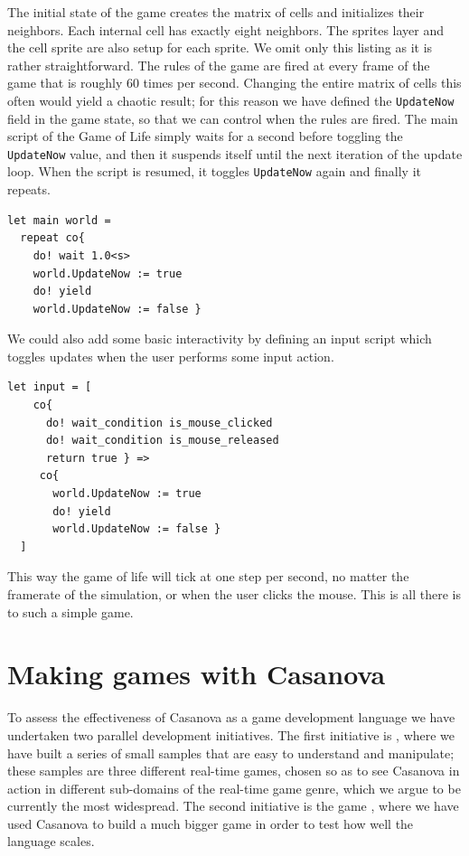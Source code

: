 The initial state of the game creates the matrix of cells and initializes their neighbors. Each internal cell has exactly eight neighbors. The sprites layer and the cell sprite are also setup for each sprite. We omit only this listing as it is rather straightforward. The rules of the game are fired at every frame of the game that is roughly 60 times per second. Changing the entire matrix of cells this often would yield a chaotic result; for this reason we have defined the \texttt{UpdateNow} field in the game state, so that we can control when the rules are fired. The main script of the Game of Life simply waits for a second before toggling the \texttt{UpdateNow} value, and then it suspends itself until the next iteration of the update loop. When the script is resumed, it toggles \texttt{UpdateNow} again and finally it repeats. 

\begin{lstlisting}
let main world = 
  repeat co{ 
    do! wait 1.0<s> 
    world.UpdateNow := true 
    do! yield 
    world.UpdateNow := false } 
\end{lstlisting}

We could also add some basic interactivity by defining an input script which toggles updates when the user performs some input action.

\begin{lstlisting}
let input = [
    co{  
      do! wait_condition is_mouse_clicked
      do! wait_condition is_mouse_released
      return true } =>
     co{
       world.UpdateNow := true
       do! yield
       world.UpdateNow := false }
  ]
\end{lstlisting}

This way the game of life will tick at one step per second, no matter the framerate of the simulation, or when the user clicks the mouse. This is all there is to such a simple game.

\section{Making games with Casanova}
To assess the effectiveness of Casanova as a game development language we have undertaken two parallel development initiatives. The first initiative is \cite{CASANOVA_CODEPLEX}, where we have built a series of small samples that are easy to understand and manipulate; these samples are three different real-time games, chosen so as to see Casanova in action in different sub-domains of the real-time game genre, which we argue to be currently the most widespread. The second initiative is the game  \cite{GALAXY_WARS}, where we have used Casanova to build a much bigger game in order to test how well the language scales.

